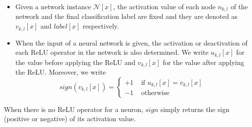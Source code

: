 \documentclass[runningheads,a4paper]{llncs}
\newcommand{\networks}{\mathcal{N}}
\begin{document}
\begin{itemize}
  \item Given a network instance $\networks[x]$, the activation value of
    each node $n_{k,l}$ of the network and the final classification label
    are fixed and they are denoted as $v_{k,l}[x]$ and $\mathit{label}[x]$
    respectively.

    \item When the input of a neural network is given, the activation or
deactivation of each ReLU operator in the network is also determined.  We
write $u_{k,l}[x]$ for the value before applying the ReLU and $v_{k,l}[x]$
for the value after applying the ReLU.  Moreover, we write
  \begin{equation}
    \label{eq:sign}
    \mathit{sign}(v_{k,l}[x])=
    \begin{cases}
      +1 &\mbox{  if } u_{k,l}[x] = v_{k,l}[x] \\
      -1 & \mbox{  otherwise}
    \end{cases}
  \end{equation}
\end{itemize}

When there is no ReLU operator for a neuron, $\mathit{sign}$ simply returns
the sign (positive or negative) of its activation value.
\end{document}
